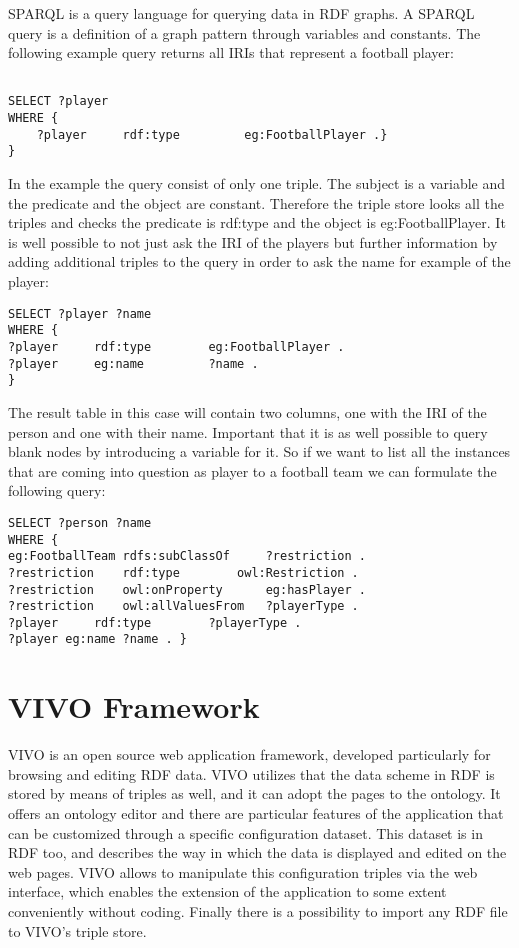 SPARQL is a query language for querying data in RDF graphs. A SPARQL query is a definition of a graph pattern through variables and constants. The following example query returns all IRIs that represent a football player: 

\begin{lstlisting}[captionpos=b, caption=SPARQL Query, label=lst:sparql,
basicstyle=\ttfamily,frame=single]

SELECT ?player  
WHERE { 
	?player	 	rdf:type		 eg:FootballPlayer .}	
}
\end{lstlisting}

In the example the query consist of only one triple. The subject is a variable and the predicate and the object are constant. Therefore the triple store looks all the triples and checks the predicate is rdf:type and the object is eg:FootballPlayer. 
It is well possible to not just ask the IRI of the players but further information by adding additional triples to the query in order to ask the name for example of the player:

\begin{lstlisting}[captionpos=b, caption=SPARQL Query, label=lst:sparql,
basicstyle=\ttfamily,frame=single]
SELECT ?player ?name 
WHERE { 
?player		rdf:type	 	eg:FootballPlayer .	
?player		eg:name			?name .
}
\end{lstlisting}

The result table in this case will contain two columns, one with the IRI of the person and one with their name. Important that it is as well possible to query blank nodes by introducing a variable for it. So if we want to list all the instances that are coming into question as player to a football team we can formulate the following query:

\begin{lstlisting}[captionpos=b, caption=SPARQL Query, label=lst:sparql,
basicstyle=\ttfamily,frame=single]
SELECT ?person ?name
WHERE {
eg:FootballTeam	rdfs:subClassOf		?restriction .
?restriction	rdf:type		owl:Restriction .
?restriction	owl:onProperty		eg:hasPlayer .
?restriction	owl:allValuesFrom	?playerType .
?player		rdf:type		?playerType .
?player	eg:name	?name . }
\end{lstlisting}

\section{VIVO Framework}

VIVO is an open source web application framework, developed particularly for browsing and editing RDF data. VIVO utilizes that the data scheme in RDF is stored by means of triples as well, and it can adopt the pages to the ontology.  It offers an ontology editor and there are particular features of the application that can be customized through a specific configuration dataset.  This dataset is in RDF too, and describes the way in which the data is displayed and edited on the web pages. VIVO allows to manipulate this configuration triples via the web interface, which enables the extension of the application to some extent conveniently without coding. Finally there is a possibility to import any RDF file to VIVO’s triple store.

